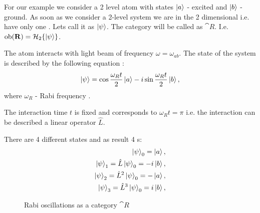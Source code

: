 \begin{example}  
  For our example we consider a 2 level atom with states $\ket{a}$ -
  excited and $\ket{b}$ - ground.
  As soon as we consider a 2-level system we are in the 2 dimensional
   i.e. have only one . Lets call
  it as $\ket{\psi}$. The category will be called as
  $\cat{R}$. I.e. $\mathrm{ob}(\mathbf{R}) = \mathcal{H}_2
  \{\ket{\psi}\}$.  

  The atom interacts with light beam of
  frequency $\omega = \omega_{ab}$. The state of the system is
  described by the following equation \cite{bib:quantum_optics_mine}:
  \begin{equation}
    \ket{\psi} = \cos{\frac{\omega_R t}{2}} \ket{a} -
      i \sin{\frac{\omega_R t}{2}} \ket{b},
    \nonumber
  \end{equation}
  where $\omega_R$ - Rabi frequency \cite{bib:quantum_optics_mine}. 

  The interaction time $t$ is fixed and corresponds to $\omega_R t =
  \pi$ i.e. the interaction can be described a linear operator $\hat{L}$.
  
  There are 4 different states and as result 4
  s:
  \begin{eqnarray}
    \ket{\psi}_0 = \ket{a},
    \nonumber \\
    \ket{\psi}_1 = \hat{L} \ket{\psi}_0 = -i \ket{b},
    \nonumber \\
    \ket{\psi}_2 = \hat{L}^2 \ket{\psi}_0 = - \ket{a},
    \nonumber \\
    \ket{\psi}_3 = \hat{L}^3 \ket{\psi}_0 = i \ket{b},
    \nonumber
  \end{eqnarray}

\begin{figure}
  \centering
  \caption{Rabi oscillations as a category $\cat{R}$}
  \label{fig:example_quantum}
\end{figure}
\end{example}
